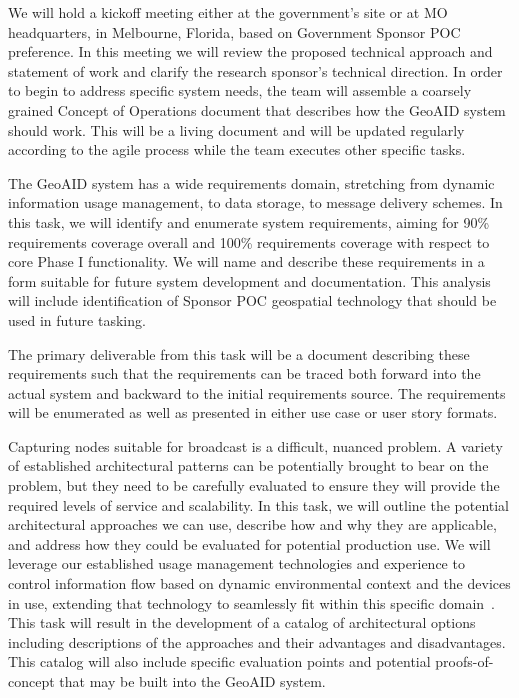 \documentclass{sbir}
\begin{document}
We will hold a kickoff meeting either at the government's site or at MO headquarters, in Melbourne, Florida, based on Government Sponsor POC preference. In this meeting we will review the proposed technical approach and statement of work and clarify the research sponsor's technical direction. In order to begin to address specific system needs, the team will assemble a coarsely grained Concept of Operations document that describes how the GeoAID system should work. This will be a living document and will be updated regularly according to the agile process while the team executes other specific tasks. 

The GeoAID system has a wide requirements domain, stretching from dynamic information usage management, to data storage, to message delivery schemes. In this task, we will identify and enumerate system requirements, aiming for 90\% requirements coverage overall and 100\% requirements coverage with respect to core Phase I functionality. We will name and describe these requirements in a form suitable for future system development and documentation. This analysis will include identification of Sponsor POC geospatial technology that should be used in future tasking.

The primary deliverable from this task will be a document describing these requirements such that the requirements can be traced both forward into the actual system and backward to the initial requirements source. The requirements will be enumerated as well as presented in either use case or user story formats.

Capturing nodes suitable for broadcast is a difficult, nuanced problem. A variety of established architectural patterns can be potentially brought to bear on the problem, but they need to be carefully evaluated to ensure they will provide the required levels of service and scalability. In this task, we will outline the potential architectural approaches we can use, describe how and why they are applicable, and address how they could be evaluated for potential production use. We will leverage our established usage management technologies and experience to control information flow based on dynamic environmental context and the devices in use, extending that technology to seamlessly fit within this specific domain~\cite{JaLaHe:11,JaLaHe:12}.
This task will result in the development of a catalog of architectural options including descriptions of the approaches and their advantages and disadvantages. This catalog will also include specific evaluation points and potential proofs-of-concept that may be built into the GeoAID system.
\end{document}
